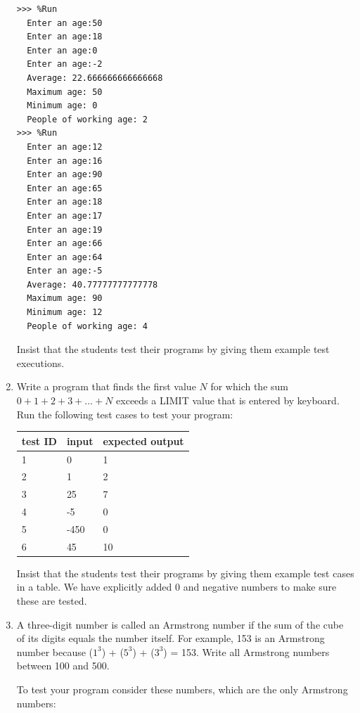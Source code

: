 \documentclass[
  fontsize=10pt,
  a4paper,
]{scrartcl}
\newenvironment{howTILEd}%
  {\begin{mdframed}[skipabove=10pt,skipbelow=10pt,backgroundcolor=pink!40]}%
  {\end{mdframed}}
\begin{document}
\begin{enumerate}
\begin{Verbatim}[frame=single, label={\em examples of test executions}]
>>> %Run 
  Enter an age:50
  Enter an age:18
  Enter an age:0
  Enter an age:-2
  Average: 22.666666666666668
  Maximum age: 50
  Minimum age: 0
  People of working age: 2
>>> %Run 
  Enter an age:12
  Enter an age:16
  Enter an age:90
  Enter an age:65
  Enter an age:18
  Enter an age:17
  Enter an age:19
  Enter an age:66
  Enter an age:64
  Enter an age:-5
  Average: 40.77777777777778
  Maximum age: 90
  Minimum age: 12
  People of working age: 4
\end{Verbatim}

\begin{howTILEd}
Insist that the students test their programs by giving them example test executions.
\end{howTILEd}



\item Write a program that finds the first value $N$ for which the sum $0 + 1 + 2 + 3 + ... + N$ exceeds a LIMIT value that is entered by keyboard.
Run the following test cases to test your program:

\begin{tabular}{|l|l|l|}
\hline
test ID  & input & expected output  \\ 
\hline\hline
1 & 0  & 1 \\
2 & 1  &  2   \\
3 & 25 & 7  \\
4 & -5 & 0 \\
5 & -450 & 0 \\
6 & 45 & 10\\
\hline
\end{tabular}


\begin{howTILEd}
Insist that the students test their programs by giving them example test cases in a table. We have explicitly added 0 and negative numbers to make sure these are tested.
\end{howTILEd}



\item A three-digit number is called an Armstrong number if the sum of the cube of its digits equals the number itself.
For example, 153 is an Armstrong number because ($1 ^ 3$) + ($5 ^ 3$) + ($3 ^ 3$) = 153. Write all Armstrong numbers between 100 and 500.

To test your program consider these numbers, which are the only Armstrong numbers:


\end{enumerate}
\end{document}
